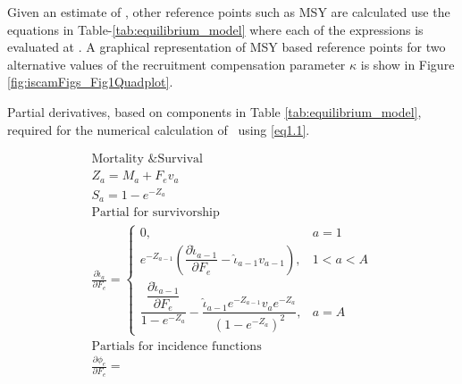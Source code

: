 \begin{multicols}{2}
Given an estimate of \fmsy, other reference points such as MSY are calculated use the equations in Table-\ref{tab:equilibrium_model} where each of the expressions is evaluated at \fmsy.  A graphical representation of MSY based reference points for two alternative values of the recruitment compensation parameter $\kappa$ is show in Figure \ref{fig:iscamFigs_Fig1Quadplot}.


\begin{tablehere}
  \centering
\caption{Partial derivatives, based on components in Table
\ref{tab:equilibrium_model}, required for the numerical calculation of \fmsy\ using \eqref{eq1.1}.}\label{tab:partial_derivatives} \tableEq
    \begin{gather}
        \hline
        \mbox{Mortality \& Survival} \nonumber \\
        Z_{a}=M_a+F_ev_a                                \label{T3.1} \\
        S_{a}=1-e^{-Z_a}                                \label{T3.2}\\[1ex]
        \mbox{Partial for survivorship} \nonumber \\
        \frac{\partial \hat{\iota}_a}{\partial F_e} =
        \begin{cases}
          0,& a=1                                       \label{T3.3}\\
          e^{-Z_{a-1}}\left(\dfrac{\partial \hat{\iota}_{a-1}}{\partial F_e}
           -\hat{\iota}_{a-1}v_{a-1}\right),& 1<a<A\\
           \dfrac{\dfrac{\partial \hat{\iota}_{a-1}}{\partial F_e}}
           {1-e^{-Z_a}} -
           \dfrac{\hat{\iota}_{a-1} e^{-Z_{a-1}} v_a e^{-Z_a}}
           {(1-e^{-Z_a})^2}, &a=A
        \end{cases} \\[1ex]
        \mbox{Partials for incidence functions} \nonumber \\
        \frac{\partial \phi_e}{\partial F_e}=

\end{gather}
\end{tablehere}
\end{multicols}

